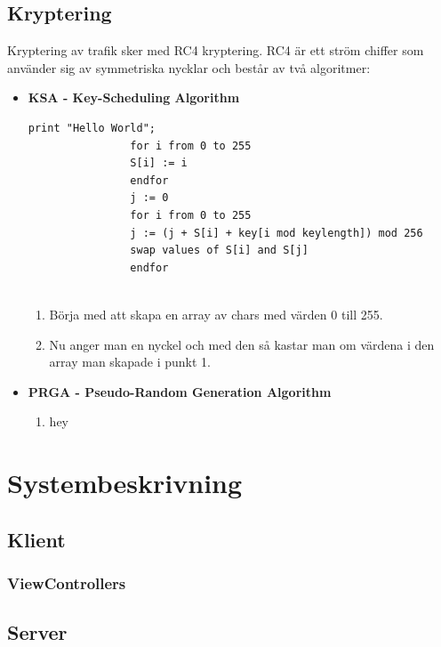 \documentclass[10pt, titlepage, oneside, a4paper]{article}
\begin{document}
    	\subsection{Kryptering}
    	Kryptering av trafik sker med RC4 kryptering. RC4 är ett ström chiffer som använder sig av symmetriska nycklar och består av två algoritmer:
    	\begin{itemize}
    		\item\textbf{KSA - Key-Scheduling Algorithm}
    		
    		\begin{lstlisting}
print "Hello World";
	    		for i from 0 to 255
	    		S[i] := i
				endfor
				j := 0
				for i from 0 to 255
	    		j := (j + S[i] + key[i mod keylength]) mod 256
	    		swap values of S[i] and S[j]
				endfor
				
    		\end{lstlisting}
    		
    		\begin{enumerate}
    			\item Börja med att skapa en array av chars med värden 0 till 255.
    			\item Nu anger man en nyckel och med den så kastar man om värdena i den array man skapade i punkt 1.
    		\end{enumerate}
    		\item\textbf{PRGA - Pseudo-Random Generation Algorithm}
    		\begin{enumerate}
    			\item hey
    		\end{enumerate}
    	\end{itemize}
    	
    \section{Systembeskrivning}
    	\subsection{Klient}
    		\subsubsection{ViewControllers}
    		
    	\subsection{Server}
    		
   
   	
\end{document}
